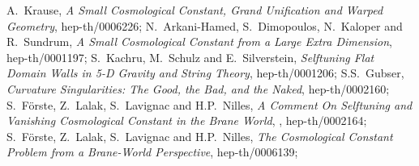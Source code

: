 \documentclass[a4paper,12pt]{article}
\begin{document}

\begin{thebibliography}{99}
   A.~Krause,
                {\it A Small Cosmological Constant, Grand Unification and
                Warped Geometry},
                hep-th/0006226;
   N.~Arkani-Hamed, S.~Dimopoulos, N.~Kaloper and R.~Sundrum,
                 {\it A Small Cosmological Constant from a Large Extra
                 Dimension},
                 hep-th/0001197;
   S.~Kachru, M.~Schulz and E.~Silverstein,
                {\it Selftuning Flat Domain Walls in 5-D Gravity and
                String Theory},
                hep-th/0001206;
   S.S.~Gubser,
                   {\it Curvature Singularities: The Good, the Bad, and the
                   Naked},
                   hep-th/0002160;
   S.~F\"orste, Z.~Lalak, S.~Lavignac and H.P.~Nilles,
                  {\it A Comment On Selftuning and Vanishing Cosmological
                  Constant in the Brane World},
                  , hep-th/0002164;
   S.~F\"orste, Z.~Lalak, S.~Lavignac and H.P.~Nilles,
                  {\it The Cosmological Constant Problem from a Brane-World
                  Perspective},
                  hep-th/0006139;
\end{thebibliography}
\end{document}
